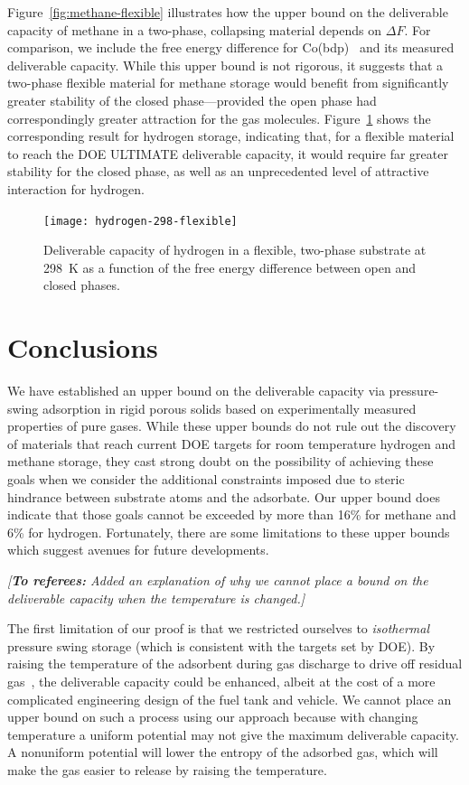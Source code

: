 \documentclass[twoside,twocolumn,9pt]{article}
\newcommand\startreferees[1]{\cbstart \noindent\textit{\color{red}%
[\textbf{To referees:} #1]}

}
\newcommand\donereferees{\cbend}
\begin{document}
Figure~\ref{fig:methane-flexible} illustrates
how the upper bound on the deliverable capacity of methane in a two-phase,
collapsing material depends on $\Delta F$. 
For comparison, we include the free energy
difference for Co(bdp)~\cite{choi2008broadly} and its measured deliverable capacity.  
While this upper bound is not rigorous, it suggests that a two-phase flexible material for methane storage
would benefit from significantly greater stability of the closed phase---provided the open phase
had correspondingly greater attraction for the gas molecules.  Figure~\ref{fig:hydrogen-flexible}
shows the corresponding result for hydrogen storage, indicating that, for a flexible material to
reach the DOE ULTIMATE deliverable capacity, it would require far greater stability for the closed
phase, as well as an unprecedented level of attractive interaction for hydrogen.

\begin{figure}
    \centering
    \texttt{[image: hydrogen-298-flexible]}
    \caption{Deliverable capacity of hydrogen in a flexible, two-phase substrate at 298\ K as a function of the free energy difference 
      between open and closed phases.}
    \label{fig:hydrogen-flexible}
\end{figure}

\donereferees

\section{Conclusions}
We have established an upper bound on the deliverable capacity via
pressure-swing adsorption in rigid porous solids based on experimentally
measured properties of pure gases. While these upper bounds do not rule out the
discovery of materials that reach current DOE targets for room temperature hydrogen and methane storage, they cast strong doubt
on the possibility of achieving these goals when we consider the additional
constraints imposed due to steric hindrance between substrate atoms and the
adsorbate. Our upper bound does indicate that those goals cannot be exceeded by
more than 16\% for methane and 6\% for hydrogen. Fortunately, there are some
limitations to these upper bounds which suggest avenues for future developments.

\startreferees{Added an explanation of why we cannot place a bound on the
  deliverable capacity when the temperature is changed.}

The first limitation of our proof is that we restricted ourselves to
\emph{isothermal} pressure swing storage (which is consistent with the targets set by DOE). By raising the temperature of the
adsorbent during gas discharge to drive off residual
gas~\cite{gomez2014exploring}, the deliverable capacity could be enhanced,
albeit at the cost of a more complicated engineering design of the fuel tank
and vehicle.
%
We cannot place an upper bound on such a process using our approach because with
changing temperature a uniform potential may not give the maximum deliverable
capacity.  A nonuniform potential will lower the entropy of the adsorbed gas,
which will make the gas easier to release by raising the temperature.
\end{document}
